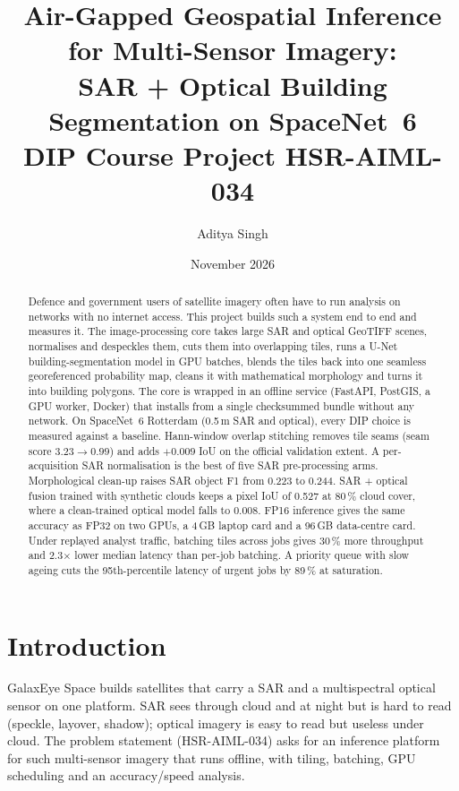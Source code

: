 \documentclass[11pt,a4paper]{article}
\title{Air-Gapped Geospatial Inference for Multi-Sensor Imagery:\\
SAR + Optical Building Segmentation on SpaceNet~6\\[4pt]
\large DIP Course Project HSR-AIML-034}
\author{Aditya Singh}
\date{November 2026}
\begin{document}
\maketitle

\begin{abstract}
Defence and government users of satellite imagery often have to run analysis on networks
with no internet access. This project builds such a system end to end and measures it. The
image-processing core takes large SAR and optical GeoTIFF scenes, normalises and
despeckles them, cuts them into overlapping tiles, runs a U-Net building-segmentation
model in GPU batches, blends the tiles back into one seamless georeferenced probability map,
cleans it with mathematical morphology and turns it into building polygons. The core is
wrapped in an offline service (FastAPI, PostGIS, a GPU worker, Docker) that installs from a
single checksummed bundle without any network.
On SpaceNet~6 Rotterdam (0.5\,m SAR and optical), every DIP choice is measured
against a baseline. Hann-window overlap stitching removes tile seams (seam score
$3.23 \to 0.99$) and adds $+0.009$ IoU on the official validation extent. A per-acquisition
SAR normalisation is the best of five SAR pre-processing arms. Morphological clean-up raises
SAR object F1 from 0.223 to 0.244. SAR + optical fusion trained with synthetic clouds keeps
a pixel IoU of 0.527 at 80\,\% cloud cover, where a clean-trained optical model falls to 0.008.
FP16 inference gives the same accuracy as FP32 on two GPUs, a 4\,GB laptop card and a 96\,GB
data-centre card. Under replayed analyst traffic, batching tiles across jobs gives 30\,\%
more throughput and 2.3$\times$ lower median latency than per-job batching. A priority
queue with slow ageing cuts the 95th-percentile latency of urgent jobs by 89\,\% at
saturation.
\end{abstract}

\section{Introduction}
\label{sec:intro}

GalaxEye Space builds satellites that carry a SAR and a multispectral optical sensor on one
platform. SAR sees through cloud and at night but is hard to read (speckle, layover,
shadow); optical imagery is easy to read but useless under cloud. The problem statement
(HSR-AIML-034) asks for an inference platform for such multi-sensor imagery that runs
offline, with tiling, batching, GPU scheduling and an accuracy/speed analysis.
\end{document}
